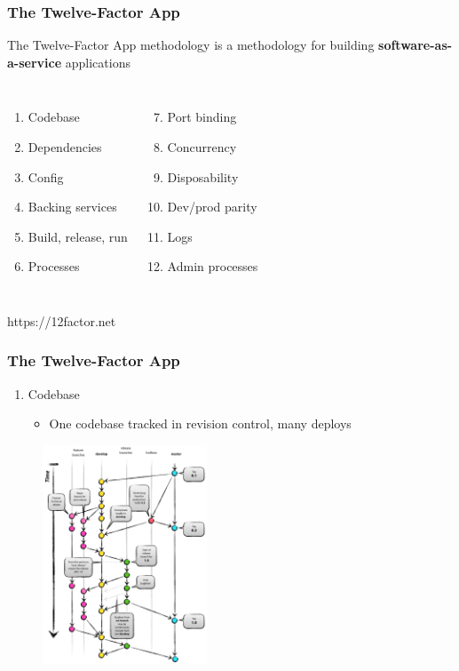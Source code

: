 \documentclass{beamer}
\begin{document}
	\begin{frame}
		\frametitle{The Twelve-Factor App}
			The Twelve-Factor App methodology is a methodology for building \textbf{software-as-a-service} applications
			\begin{columns}[c]
				\begin{enumerate}
					\item Codebase
					\item Dependencies
					\item Config
					\item Backing services
					\item Build, release, run
					\item Processes
				\end{enumerate}
				
				\begin{enumerate}
					\setcounter{enumi}{6}
					\item Port binding
					\item Concurrency
					\item Disposability
					\item Dev/prod parity
					\item Logs
					\item Admin processes
				\end{enumerate}
				
			\end{columns}
			\vspace{20mm}
			\tiny{https://12factor.net}	
		\end{frame}
	
		\begin{frame}
			\frametitle{The Twelve-Factor App}
				\begin{enumerate}
					\item Codebase
						\begin{itemize}
							\item One codebase tracked in revision control, many deploys
						\end{itemize}
				\end{enumerate}
				\begin{figure}[h]
					\centering
					\includegraphics[width=.8\linewidth, height=65mm]{img/gitflow.png}
				\end{figure}
		\end{frame}
	
\end{document}

